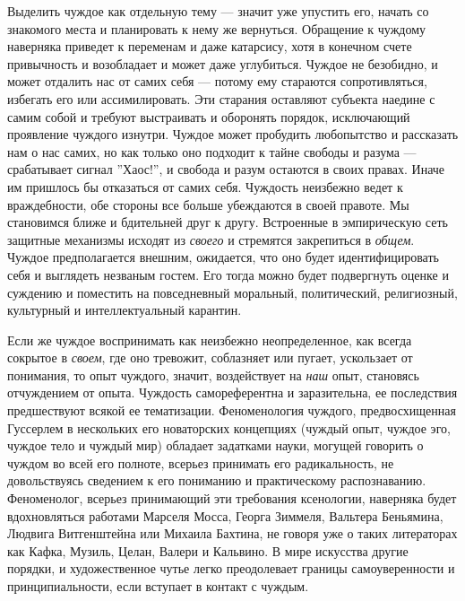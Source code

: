 \documentclass[12pt]{book}
\begin{document}
Выделить чуждое как отдельную тему --- значит уже упустить его, начать со знакомого места и планировать к нему же вернуться. Обращение к чуждому наверняка приведет к переменам и даже катарсису, хотя в конечном счете привычность и возобладает и может даже углубиться. Чуждое не безобидно, и может отдалить нас от самих себя --- потому ему стараются сопротивляться, избегать его или ассимилировать. Эти старания оставляют субъекта наедине с самим собой и требуют выстраивать и оборонять порядок, исключающий проявление чуждого изнутри. Чуждое может пробудить любопытство и рассказать нам о нас самих, но как только оно подходит к тайне свободы и разума --- срабатывает сигнал ''Хаос!'', и свобода и разум остаются в своих правах. Иначе им пришлось бы отказаться от самих себя. Чуждость неизбежно ведет к враждебности, обе стороны все больше убеждаются в своей правоте. Мы становимся ближе и бдительней друг к другу. Встроенные в эмпирическую сеть защитные механизмы исходят из \textit{своего} и стремятся закрепиться в \textit{общем}. Чуждое предполагается внешним, ожидается, что оно будет идентифицировать себя и выглядеть незваным гостем. Его тогда можно будет подвергнуть оценке и суждению и поместить на повседневный моральный, политический, религиозный, культурный и интеллектуальный карантин.

Если же чуждое воспринимать как неизбежно неопределенное, как всегда сокрытое в \textit{своем}, где оно тревожит, соблазняет или пугает, ускользает от понимания, то опыт чуждого, значит, воздействует на \textit{наш} опыт, становясь отчуждением от опыта. Чуждость самореферентна и заразительна, ее последствия предшествуют всякой ее тематизации. Феноменология чуждого, предвосхищенная Гуссерлем в нескольких его новаторских концепциях (чуждый опыт, чуждое эго, чуждое тело и чуждый мир) обладает задатками науки, могущей говорить о чуждом во всей его полноте, всерьез принимать его радикальность, не довольствуясь сведением к его пониманию и практическому распознаванию. Феноменолог, всерьез принимающий эти требования ксенологии, наверняка будет вдохновляться работами Марселя Мосса, Георга Зиммеля, Вальтера Беньямина, Людвига Витгенштейна или Михаила Бахтина, не говоря уже о таких литераторах как Кафка, Музиль, Целан, Валери и Кальвино. В мире искусства другие порядки, и художественное чутье легко преодолевает границы самоуверенности и принципиальности, если вступает в контакт с чуждым.
\end{document}
